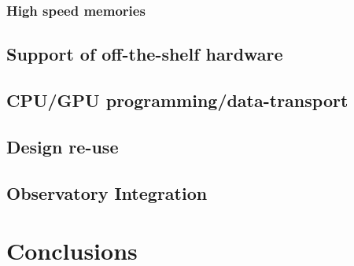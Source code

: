 \documentclass{ws-jai}
\begin{document}
\subsubsection{High speed memories}


\subsection{Support of off-the-shelf hardware}

\subsection{CPU/GPU programming/data-transport}

\subsection{Design re-use}

\subsection{Observatory Integration}


\section{Conclusions} \label{sec:Conclusions}


 
\end{document}
